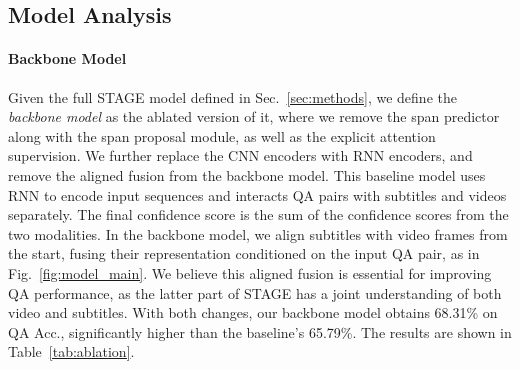 \documentclass[11pt,a4paper]{article}
\begin{document}
\begin{table}[!t]
\centering
\small
{}
\caption{QA Acc. by question type on TVQA+ val set. For brevity, we only show top-5 question types (percentage in brackets). 
AF=Aligned Fusion, TS=Temp. Sup., SS=Spat. Sup., LF=Local Feature. \textit{Each column adds an extra component to the column before it.}
}
\label{tab:acc_by_qtype}
\end{table}




\subsection{Model Analysis}
\paragraph{Backbone Model} 
Given the full STAGE model defined in Sec.~\ref{sec:methods}, we define the \textit{backbone model} as the ablated version of it, where we remove the span predictor along with the span proposal module, as well as the explicit attention supervision.
We further replace the CNN encoders with RNN encoders, and remove the aligned fusion from the backbone model. 
This baseline model uses RNN to encode input sequences and interacts QA pairs with subtitles and videos separately. The final confidence score is the sum of the confidence scores from the two modalities. 
In the backbone model, we align subtitles with video frames from the start, fusing their representation conditioned on the input QA pair, as in Fig.~\ref{fig:model_main}.
We believe this aligned fusion is essential for improving QA performance, as the latter part of STAGE has a joint understanding of both video and subtitles. 
With both changes, our backbone model obtains 68.31\% on QA Acc., significantly higher than the baseline's 65.79\%. The results are shown in Table~\ref{tab:ablation}.
\end{document}
